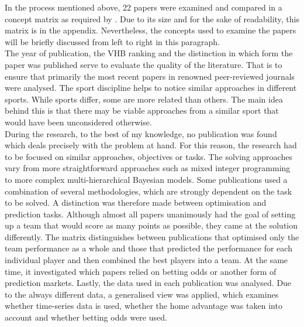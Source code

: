 In the process mentioned above, 22 papers were examined and compared in a concept matrix as required by \citeauthor{webster_guest_2002}. Due to its size and for the sake of readability, this matrix is in the appendix. Nevertheless, the concepts used to examine the papers will be briefly discussed from left to right in this paragraph. \\
\indent The year of publication, the VHB ranking and the distinction in which form the paper was published serve to evaluate the quality of the literature. That is to ensure that primarily the most recent papers in renowned peer-reviewed journals were analysed. The sport discipline helps to notice similar approaches in different sports. While sports differ, some are more related than others. The main idea behind this is that there may be viable approaches from a similar sport that would have been unconsidered otherwise.  \\
\indent During the research, to the best of my knowledge, no publication was found which deals precisely with the problem at hand. For this reason, the research had to be focused on similar approaches, objectives or tasks. The solving approaches vary from more straightforward approaches such as mixed integer programming to more complex multi-hierarchical Bayesian models. Some publications used a combination of several methodologies, which are strongly dependent on the task to be solved. A distinction was therefore made between optimisation and prediction tasks. Although almost all papers unanimously had the goal of setting up a team that would score as many points as possible, they came at the solution differently. The matrix distinguishes between publications that optimised only the team performance as a whole and those that predicted the performance for each individual player and then combined the best players into a team. At the same time, it investigated which papers relied on betting odds or another form of prediction markets. Lastly, the data used in each publication was analysed. Due to the always different data, a generalised view was applied, which examines whether time-series data is used, whether the home advantage was taken into account and whether betting odds were used.



